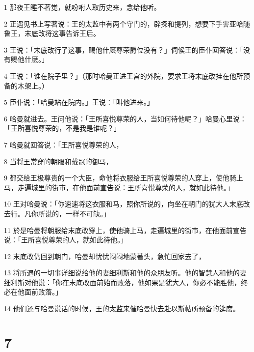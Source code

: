 \par 1 那夜王睡不著觉，就吩咐人取历史来，念给他听。
\par 2 正遇见书上写著说：王的太监中有两个守门的，辟探和提列，想要下手害亚哈随鲁王，末底改将这事告诉王后。
\par 3 王说：「末底改行了这事，赐他什麽尊荣爵位没有？」伺候王的臣仆回答说：「没有赐他什麽。」
\par 4 王说：「谁在院子里？」（那时哈曼正进王宫的外院，要求王将末底改挂在他所预备的木架上。）
\par 5 臣仆说：「哈曼站在院内。」王说：「叫他进来。」
\par 6 哈曼就进去。王问他说：「王所喜悦尊荣的人，当如何待他呢？」哈曼心里说：「王所喜悦尊荣的，不是我是谁呢？」
\par 7 哈曼就回答说：「王所喜悦尊荣的人，
\par 8 当将王常穿的朝服和戴冠的御马，
\par 9 都交给王极尊贵的一个大臣，命他将衣服给王所喜悦尊荣的人穿上，使他骑上马，走遍城里的街市，在他面前宣告说：王所喜悦尊荣的人，就如此待他。」
\par 10 王对哈曼说：「你速速将这衣服和马，照你所说的，向坐在朝门的犹大人末底改去行。凡你所说的，一样不可缺。」
\par 11 於是哈曼将朝服给末底改穿上，使他骑上马，走遍城里的街市，在他面前宣告说：「王所喜悦尊荣的人，就如此待他。」
\par 12 末底改仍回到朝门，哈曼却忧忧闷闷地蒙著头，急忙回家去了，
\par 13 将所遇的一切事详细说给他的妻细利斯和他的众朋友听。他的智慧人和他的妻细利斯对他说：「你在末底改面前始而败落，他如果是犹大人，你必不能胜他，终必在他面前败落。」
\par 14 他们还与哈曼说话的时候，王的太监来催哈曼快去赴以斯帖所预备的筵席。

\chapter{7}

